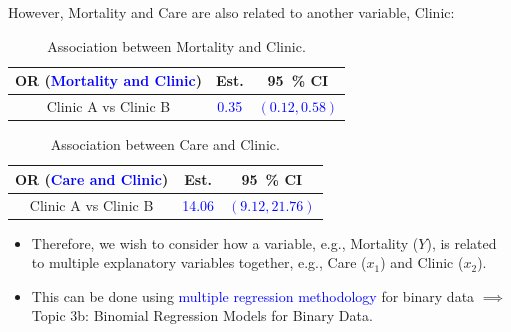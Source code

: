 \documentclass{article}\usepackage[]{graphicx}\usepackage[svgnames]{xcolor}
\begin{document}
However, Mortality and Care are also related to another variable, Clinic:
\begin{table}[!htbp]
      \centering
      \begin{tabular}{ccc}
            OR (\textcolor{Blue}{Mortality and Clinic}) & Est.                   & \qty{95}{\percent} CI             \\
            \midrule
            Clinic A vs Clinic B                        & \textcolor{Blue}{0.35} & \textcolor{Blue}{$ (0.12,0.58) $} \\
            \bottomrule
      \end{tabular}
      \caption{Association between Mortality and Clinic.}
\end{table}
\begin{table}[!htbp]
      \centering
      \begin{tabular}{ccc}
            OR (\textcolor{Blue}{Care and Clinic}) & Est.                    & \qty{95}{\percent} CI              \\
            \midrule
            Clinic A vs Clinic B                   & \textcolor{Blue}{14.06} & \textcolor{Blue}{$ (9.12,21.76) $} \\
            \bottomrule
      \end{tabular}
      \caption{Association between Care and Clinic.}
\end{table}
\begin{itemize}
      \item Therefore, we wish to consider how a variable, e.g., Mortality ($ Y $), is related to
            multiple explanatory variables together, e.g., Care ($ x_1 $) and Clinic ($ x_2 $).
      \item This can be done using \textcolor{Blue}{multiple regression methodology} for binary data $ \implies $
            Topic 3b: Binomial Regression Models for Binary Data.
\end{itemize}
\end{document}
